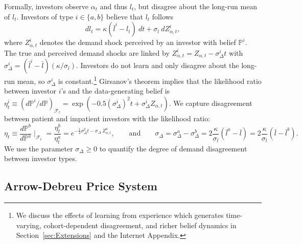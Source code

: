 \documentclass[preprint,11pt,authoryear]{elsarticle}
\theoremstyle{plain}
\begin{document}
Formally, investors observe $\alpha_t$ and thus $l_t$, but disagree about the long-run mean of $l_t$. Investors of type $i \in \{ a,b \}$  believe that $l_t$ follows 
\begin{equation}\label{l_dynamics_perceived} dl_t = \kappa\left(\bar{l}^i - l_t\right) \: dt + \sigma_{l} \: dZ^i_{\alpha,t}, \end{equation} 
where $Z^i_{\alpha,t}$ denotes the demand shock perceived by an investor with belief $\mathbb{P}^i$. The true and perceived demand shocks are linked by $Z^i_{\alpha,t} = Z_{\alpha,t} - \sigma_{\Delta}^i t$ with $\sigma_{\Delta}^i = \left(\bar{l}^i - \bar{l}\right)(\kappa/\sigma_{l})$. Investors do not learn and only disagree about the long-run mean, so $\sigma_{\Delta}^i$ is constant.\footnote{We discuss the effects of learning from experience which generates time-varying, cohort-dependent disagreement, and richer belief dynamics in Section~\ref{sec:Extensions} and the Internet Appendix.} Girsanov's theorem implies that the likelihood ratio between investor $i$'s and the data-generating belief is $\eta_t^i \equiv (d\mathbb{P}^i/d\mathbb{P})_{\mathcal{F}_t} = \exp \left(-0.5 \left( \sigma_{\Delta}^i \right)^2 t + \sigma_{\Delta}^i Z_{\alpha,t}\right)$. We capture disagreement between patient and impatient investors with the likelihood ratio:
\begin{equation}\label{eq:LR} 
    \eta_t \equiv \frac{d\mathbb{P}^b}{d\mathbb{P}^a} \mid_{\mathcal{F}_t} = \frac{\eta_t^b}{\eta_t^a} = e^{- \frac{1}{2}\sigma_{\Delta}^2 t - \sigma_{\Delta}\: Z_{\alpha,t}^a}, \qquad \text{and} \qquad 
    \sigma_{\Delta}= \sigma_{\Delta}^a - \sigma_{\Delta}^b = 2 \frac{\kappa}{\sigma_{l}} \left( \bar{l}^a - \bar{l} \right) =
     2 \frac{\kappa}{\sigma_{l}} \left(  \bar{l} - \bar{l}^b \right). 
\end{equation} 
We use the parameter $\sigma_{\Delta}\geq 0$ to quantify the degree of demand disagreement between investor types.
    
 
\subsection{Arrow-Debreu Price System} 
\end{document}
